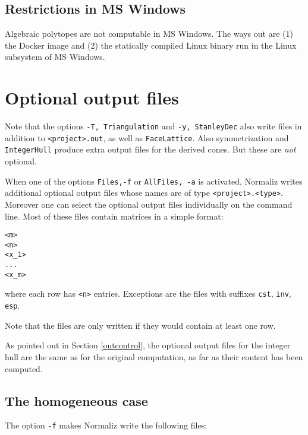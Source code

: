 \documentclass[12pt,a4paper]{scrartcl}
\theoremstyle{definition}
\def\ttt{\texttt}
\begin{document}
\subsection{Restrictions in MS Windows}

Algebraic polytopes are not computable in MS Windows. The ways out are (1) the Docker image and (2) the statically compiled Linux binary run in the Linux subsystem of MS Windows.


\section{Optional output files}\label{optionaloutput}

Note that the options \verb|-T, Triangulation| and \verb|-y, StanleyDec|  also write files in addition to \verb|<project>.out|, as well as \verb|FaceLattice|. Also symmetrization and \verb|IntegerHull| produce extra output files for the derived cones. But these are \emph{not} optional.

When one of the options \ttt{Files,-f} or \ttt{AllFiles, -a} is activated, Normaliz
writes additional optional output files whose names are of type
\ttt{<project>.<type>}. Moreover one can select the optional output files individually on the command line. Most of these files contain matrices in a simple format:
\begin{Verbatim}
<m>
<n>
<x_1>
...
<x_m>
\end{Verbatim}
where each row has \verb|<n>| entries. Exceptions are the files with suffixes \verb|cst|, \verb|inv|, \verb|esp|.

Note that the files are only written if they would contain at least one row.

As pointed out in Section \ref{outcontrol}, the optional output files for the integer hull are the same as for the original computation, as far as their content has been computed.

\subsection{The homogeneous case}

The option \ttt{-f} makes Normaliz write the following files:
\end{document}

